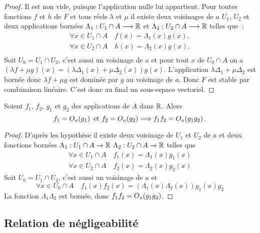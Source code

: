 \begin{proof}
  Il est non vide, puisque l'application nulle lui appartient. Pour toutes fonctions \(f\) et \(h\) de \(F\) et tous réels \(\lambda\) et \(\mu\) il existe deux voisinages de \(a\) \(U_1\), \(U_2\) et deux  applications bornées \(\Lambda_1:U_1 \cap A \longrightarrow \mathbb{R}\) et \(\Lambda_2:U_2 \cap A \longrightarrow \mathbb{R}\)  telles que~:
  \begin{gather}
    \forall x \in U_1\cap A \quad f(x)=\Lambda_1(x)g(x),\\
    \forall x \in U_2\cap A \quad h(x)=\Lambda_2(x)g(x).\\
  \end{gather}
  Soit \(U_0=U_1 \cap U_2\), c'est aussi un voisinage de \(a\) et pour tout \(x\) de \(U_0 \cap A\) on a \((\lambda f +\mu g)(x)=(\lambda\Delta_1(x)+\mu\Delta_2(x))g(x)\). L'application \(\lambda\Delta_1+\mu\Delta_2\) est bornée donc \(\lambda f + \mu g\) est dominée par \(g\) au voisinage de \(a\). Donc \(F\) est stable par combinaison linéaire. C'est donc au final un sous-espace vectoriel.
\end{proof}
\begin{prop}
  Soient \(f_1\), \(f_2\), \(g_1\) et \(g_2\) des applications de \(A\) dans \(\mathbb{R}\). Alors
  \begin{equation}
    f_1=O\mathopen{}_{a}\left(g_1\right) \text{~et~} f_2=O\mathopen{}_{a}\left(g_2\right) \Longrightarrow f_1f_2 = O\mathopen{}_{a}\left(g_1g_2\right).
  \end{equation}
\end{prop}
\begin{proof}
  D'après les hypothèse il existe deux voisinage de \(U_1\) et \(U_2\) de \(a\) et deux fonctions bornées \(\Lambda_1:U_1 \cap A \rightarrow \mathbb{R}\) \(\Lambda_2:U_2 \cap A \rightarrow \mathbb{R}\) telles que
  \begin{align}
    \forall x \in U_1\cap A \quad f_1(x)=\Lambda_1(x)g_1(x)\\
    \forall x \in U_2\cap A \quad f_2(x)=\Lambda_2(x)g_2(x)
  \end{align}
  Soit \(U_0=U_1 \cap U_2\), c'est aussi un voisinage de \(a\) et
  \begin{equation}
    \forall x \in U_0 \cap A \quad f_1(x)f_2(x) = (\Lambda_1(x) \Lambda_2(x)) g_1(x)g_2
  \end{equation}
  La fonction \(\Lambda_1 \Lambda_2\) est bornée, donc \(f_1f_2 = O\mathopen{}_{a}\left(g_1g_2\right)\).
\end{proof}

\subsection{Relation de négligeabilité}

